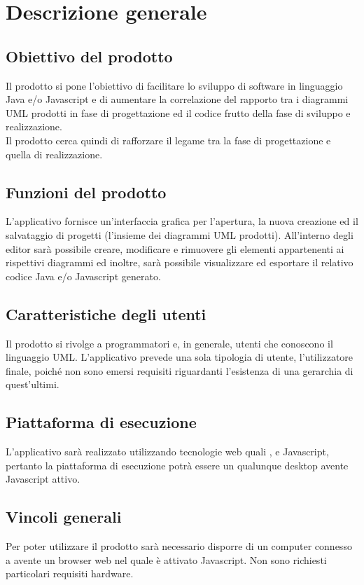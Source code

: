 \documentclass[../AnalisiDeiRequisiti.tex]{subfiles}
\begin{document}
	\section{Descrizione generale}
		\subsection{Obiettivo del prodotto}
			Il prodotto si pone l'obiettivo di facilitare lo sviluppo di software in
			linguaggio Java e/o Javascript e di aumentare la correlazione del rapporto tra
			i diagrammi UML prodotti in fase di progettazione ed il codice frutto della
			fase di sviluppo e realizzazione.\\
			Il prodotto cerca quindi di rafforzare il legame tra la fase di progettazione
			e quella di realizzazione.
		\subsection{Funzioni del prodotto}
			L'applicativo fornisce un'interfaccia grafica per l'apertura, la nuova
			creazione ed il salvataggio di progetti (l'insieme dei diagrammi UML prodotti).
			All'interno degli editor sarà possibile creare, modificare e rimuovere gli
			elementi appartenenti ai rispettivi diagrammi ed inoltre, sarà possibile
			visualizzare ed esportare il relativo codice Java e/o Javascript generato.
		\subsection{Caratteristiche degli utenti}
			Il prodotto si rivolge a programmatori e, in generale, utenti che conoscono
			il linguaggio UML. L'applicativo prevede una sola tipologia di utente,
			l'utilizzatore finale, poiché non sono emersi requisiti riguardanti
			l'esistenza di una gerarchia di quest'ultimi.
		\subsection{Piattaforma di esecuzione}
			L'applicativo sarà realizzato utilizzando tecnologie web quali ,
			 e Javascript, pertanto la piattaforma di esecuzione potrà essere un
			qualunque  desktop avente Javascript attivo.
		\subsection{Vincoli generali}
			Per poter utilizzare il prodotto sarà necessario disporre di un computer
			connesso a  avente un browser web nel quale è attivato
			Javascript. Non sono richiesti particolari requisiti hardware.
\end{document}
